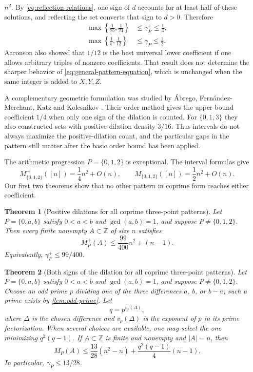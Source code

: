 \documentclass[11pt]{article}
\numberwithin{equation}{section}
\newtheorem{theorem}{Theorem}[section]
\theoremstyle{remark}
\newcommand{\Z}{\mathbb Z}
\begin{document}
$n^2$.  By \eqref{eq:reflection-relations}, one sign of $d$ accounts for at
least half of these solutions, and reflecting the set converts that sign to
$d>0$.  Therefore
\begin{align}
 \max\left\{\frac1{2b},\frac1{24}\right\}
 &\le \gamma_P^+\le\frac14,
 \label{eq:benchmark-window-plus}\\
 \max\left\{\frac1b,\frac1{12}\right\}
 &\le \gamma_P\le\frac12.
 \label{eq:benchmark-window}
\end{align}
Aaronson also showed that $1/12$ is the best universal lower coefficient if
one allows arbitrary triples of nonzero coefficients.  That result does not
determine the sharper behavior of \eqref{eq:general-pattern-equation}, which
is unchanged when the same integer is added to $X,Y,Z$.

A complementary geometric formulation was studied by \'Abrego,
Fern\'andez-Merchant, Katz and Kolesnikov \cite{AFMKK}.  Their order method
gives the upper bound coefficient $1/4$ when only one sign of the dilation is counted.
For $\{0,1,3\}$ they also constructed sets with positive-dilation density
$3/16$.  Thus intervals do not always maximize the positive-dilation count,
and the particular gaps in the pattern still matter after the basic order
bound has been applied.

The arithmetic progression $P=\{0,1,2\}$ is exceptional.  The interval
formulas give
\[
 M_{\{0,1,2\}}^+([n])=\frac14n^2+O(n),
 \qquad
 M_{\{0,1,2\}}([n])=\frac12n^2+O(n).
\]
Our first two theorems show that no other pattern in coprime form reaches
either coefficient.

\begin{theorem}[Positive dilations for all coprime three-point patterns]
\label{thm:positive-general}
Let $P=\{0,a,b\}$ satisfy $0<a<b$ and $\gcd(a,b)=1$, and suppose
$P\ne\{0,1,2\}$.  Then every finite nonempty $A\subset\Z$ of size $n$ satisfies
\begin{equation}\label{eq:positive-general-bound}
 M_P^+(A)\le \frac{99}{400}n^2+(n-1).
\end{equation}
Equivalently, $\gamma_P^+\le99/400$.
\end{theorem}

\begin{theorem}[Both signs of the dilation for all coprime three-point patterns]
\label{thm:both-signs-general}
Let $P=\{0,a,b\}$ satisfy $0<a<b$ and $\gcd(a,b)=1$, and suppose
$P\ne\{0,1,2\}$.  Choose an odd prime $p$ dividing one of the three
differences $a$, $b$, or $b-a$; such a prime exists by
\cref{lem:odd-prime}.  Let
\[
 q=p^{v_p(\Delta)},
\]
where $\Delta$ is the chosen difference and $v_p(\Delta)$ is the exponent
of $p$ in its prime factorization.  When several choices are available, one
may select the one minimizing $q^2(q-1)$.  If $A\subset\Z$ is finite and nonempty
and $|A|=n$, then
\begin{equation}\label{eq:general-bound}
 M_P(A)
 \le \frac{13}{28}(n^2-n)+\frac{q^2(q-1)}4(n-1).
\end{equation}
In particular, $\gamma_P\le13/28$.
\end{theorem}
\end{document}
